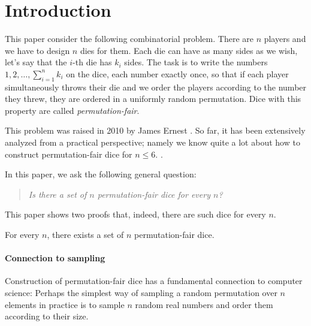 \documentclass{article}
\begin{document}


\section{Introduction}
\label{sec:intro}
This paper consider the following combinatorial problem. There are $n$ players and we have to design $n$ dies for them. Each die can have as many sides as we wish, let's say that the $i$-th die has $k_i$ sides. The task is to write the numbers $1, 2, \dots, \sum_{i = 1}^n k_i$ on the dice, each number exactly once, so that if each player simultaneously throws their die and we order the players according to the number they threw, they are ordered in a uniformly random permutation. Dice with this property are called \emph{permutation-fair}. 

This problem was raised in 2010 by James Ernest \cite{Eric_webpage}. So far, it has been extensively analyzed from a practical perspective; namely we know quite a lot about how to construct permutation-fair dice for $n \le 6$. \cite{harshbarger2012whogoesfirst,ford2023go,purcell_improved}. 

In this paper, we ask the following general question:

\vspace{0.5em}
\begin{mdframed}
\begin{quote}
 \begin{center}
{\it Is there a set of $n$ permutation-fair dice for every $n$? }
 \end{center}
 \end{quote}
\end{mdframed}
\vspace{-0.5em}


This paper shows two proofs that, indeed, there are such dice for every $n$. 

\begin{theorem}
\label{thm:main}
For every $n$, there exists a set of $n$ permutation-fair dice. 
\end{theorem}


\paragraph{Connection to sampling}
Construction of permutation-fair dice has a fundamental connection to computer science: Perhaps the simplest way of sampling a random permutation over $n$ elements in practice is to sample $n$ random real numbers and order them according to their size. 
\end{document}
